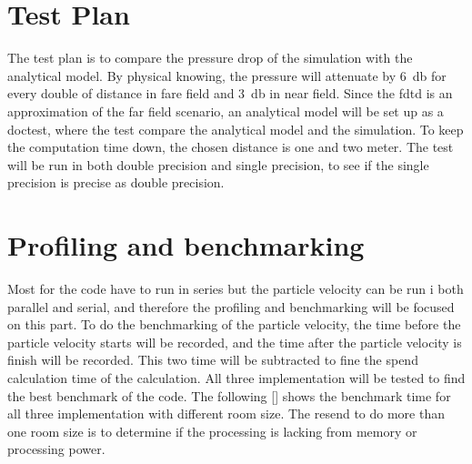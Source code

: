 \section{Test Plan}
The test plan is to compare the pressure drop of the simulation with the analytical model. By physical knowing, the pressure will attenuate by \SI{6}{\decibel} for every double of distance in fare field and \SI{3}{\decibel} in near field. Since the \gls{fdtd} is an approximation of the far field scenario, an analytical model will be set up as a doctest, where the test compare the analytical model and the simulation. To keep the computation time down, the chosen distance is one and two meter. The test will be run in both double precision and single precision, to see if the single precision is precise as double precision.

\section{Profiling and benchmarking}
Most for the code have to run in series but the particle velocity can be run i both parallel and serial, and therefore the profiling and benchmarking will be focused on this part. To do the benchmarking of the particle velocity, the time before the particle velocity starts will be recorded, and the time after the particle velocity is finish will be recorded. This two time will be subtracted to fine the spend calculation time of the calculation. All three implementation will be tested to find the best benchmark of the code. The following \autoref{} shows the benchmark time for all three implementation with different room size. The resend to do more than one room size is to determine if the processing is lacking from memory or processing power.



